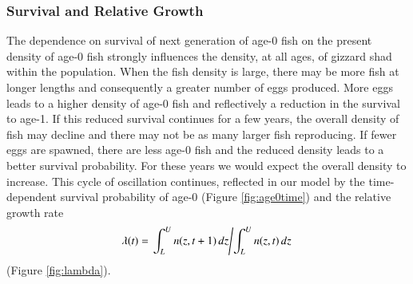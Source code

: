 \documentclass[preprint,review,12pt,authoryear]{elsarticle}
\begin{document}
\subsubsection{Survival and Relative Growth}
The dependence on survival of next generation of age-0 fish on the present density of age-0 fish strongly influences the density, at all ages, of gizzard shad within the population. 
When the fish density is large, there may be more fish at longer lengths and consequently a greater number of eggs produced.  
More eggs leads to a higher density of age-0 fish and reflectively a reduction in the survival to age-1.  
If this reduced survival continues for a few years, the overall density of fish may decline and there may not be as many larger fish reproducing.  
If fewer eggs are spawned, there are less age-0 fish and the reduced density leads to a better survival probability.  
For these years we would expect the overall density to increase.  
This cycle of oscillation continues, reflected in our model by the time-dependent survival probability of age-0 (Figure \ref{fig:age0time}) and the relative growth rate 
$$ \lambda(t) = \left. \int_L^U n(z,t+1) \, dz \middle/ \int_L^U n(z,t) \, dz \right.$$ (Figure \ref{fig:lambda}).
\end{document}
